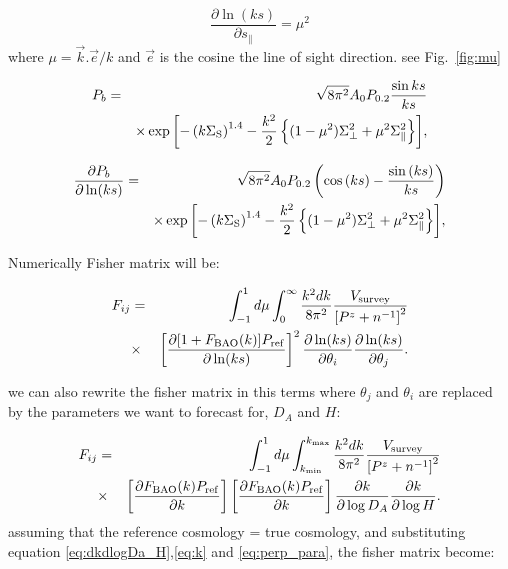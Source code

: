 \documentclass[10pt,a4paper]{article}
\begin{document}
\begin{equation}
\frac{\partial \ln (ks)}{\partial s_\parallel} = \mu^2
\end{equation}
where $\mu = \vec{k} . \vec{e}/k$ and $\vec{e}$ is the cosine the line of sight direction. see Fig.~\ref{fig:mu}

\begin{eqnarray}
 P_{ b} &=& \sqrt{8\pi^2} A_0 P_{0.2}\frac{\sin{ks}}{ks} \label{eq:gausilk} \\ \nonumber
 &&\times \exp{\left[-\left({k  \Sigma_{\rm S}}\right)^{1.4}-{k^2 \over 2} \left\{(1-\mu^2)\Sigma_\perp^2+\mu^2\Sigma_\parallel^2\right\} \right]},  
 \end{eqnarray}

\begin{eqnarray}
\frac{\partial P_{ b}}{\partial \ln (ks)} &=& \sqrt{8\pi^2} A_0 P_{0.2}\left(\cos{(ks)}  - \frac{\sin{(ks)}}{ks}\right) \label{eq:gausilk} \\ \nonumber
 &&\times \exp{\left[-\left({k  \Sigma_{\rm S}}\right)^{1.4}-{k^2 \over 2} \left\{(1-\mu^2)\Sigma_\perp^2+\mu^2\Sigma_\parallel^2\right\} \right]},  
 \end{eqnarray}

Numerically Fisher matrix will be:

\begin{eqnarray}\label{FIJ_DEV}
F_{ij}&=&\int_{-1}^{1}d\mu\int_{0}^{\infty}\frac{k^2dk}{8 \pi^2} \frac{V_{\rm survey}}{\left[P^z+n^{-1}\right]^2}\nonumber \\
& \times & \left[\frac{\partial [1+ F_{\rm BAO}(k)]P_{\rm ref}}{\partial \ln (ks)} \right ]^2 
 \frac{\partial \ln (ks)}{\partial \theta_i}\frac{\partial \ln (ks)}{\partial \theta_j} .
\end{eqnarray}




we can also rewrite the fisher matrix in this terms where $\theta_j$ and $\theta_i$ are replaced by the parameters we want to forecast for, $D_A$ and $H$:

\begin{eqnarray}\label{FIJ_re}
F_{ij}&=&\int_{-1}^{1}d\mu\int_{k_{\rm min}}^{k_{\rm max}}\frac{k^2 dk}{8\pi^2} \frac{V_{\rm survey}}{\left[P^z+n^{-1}\right]^2}\nonumber \\
& \times & \left[\frac{\partial F_{\rm BAO}(k)P_{\rm ref}}{\partial  k} \right ]\left[\frac{\partial  F_{\rm BAO}(k) P_{\rm ref}}{\partial  k} \right ]
 \frac{\partial k}{\partial \log D_A}\frac{\partial 
 k}{\partial \log H} .
\end{eqnarray}
assuming that the reference cosmology = true cosmology, and substituting equation \ref{eq:dkdlogDa_H},\ref{eq:k} and \ref{eq:perp_para}, the fisher matrix become:
\end{document}
